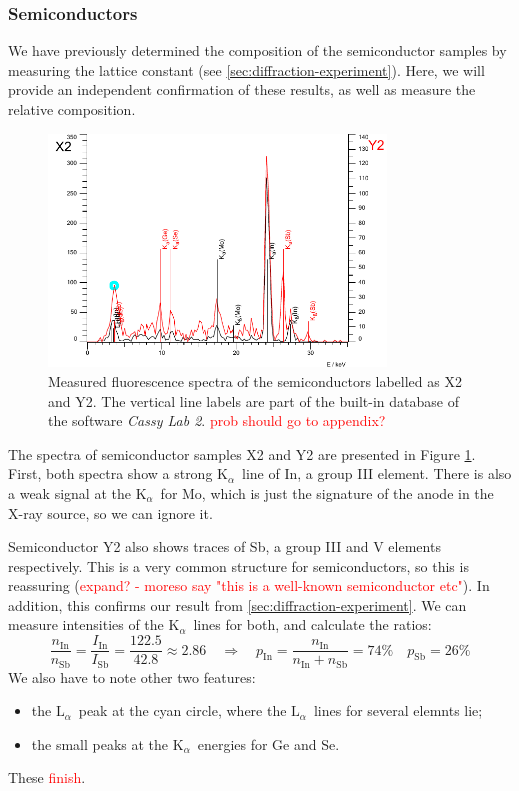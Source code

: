\documentclass[11pt,a4paper,twoside,onecolumn]{article}
\newcommand{\reminder}[1]{\textcolor{red}{#1}}
\newcommand{\Kalpha}{$\mathrm{K}_\alpha$~}
\newcommand{\Lalpha}{$\mathrm{L}_\alpha$~}
\begin{document}
\subsubsection{Semiconductors}
We have previously determined the composition of the semiconductor samples by measuring the lattice constant (see \ref{sec:diffraction-experiment}). Here, we will provide an independent confirmation of these results, as well as measure the relative composition.
\begin{figure}[!htbp]
    \centering
    \includegraphics[width=0.8\textwidth]{img/spect-semiconductors.pdf}
    \caption{Measured fluorescence spectra of the semiconductors labelled as X2 and Y2. The vertical line labels are part of the built-in database of the software \emph{Cassy Lab 2}. \reminder{prob should go to appendix?}}
    \label{fig:spect-semiconductors}
\end{figure}

The spectra of semiconductor samples X2 and Y2 are presented in Figure \ref{fig:spect-semiconductors}. First, both spectra show a strong \Kalpha line of In, a group III element. There is also a weak signal at the \Kalpha for Mo, which is just the signature of the anode in the X-ray source, so we can ignore it.

Semiconductor Y2 also shows traces of Sb, a group III and V elements respectively. This is a very common structure for semiconductors, so this is reassuring (\reminder{expand? - moreso say "this is a well-known semiconductor etc"}). In addition, this confirms our result from \ref{sec:diffraction-experiment}. We can measure intensities of the \Kalpha lines for both, and calculate the ratios:
\begin{equation}
    \frac{n_\mathrm{In}}{n_\mathrm{Sb}} = \frac{I_\mathrm{In}}{I_\mathrm{Sb}} = \frac{122.5}{42.8} \approx 2.86 \quad \Rightarrow \quad p_\mathrm{In} = \frac{n_\mathrm{In}}{n_\mathrm{In}+n_\mathrm{Sb}} = 74 \% \quad p_\mathrm{Sb} = 26 \%
\end{equation}
We also have to note other two features:
\begin{itemize}[noitemsep]
    \item the \Lalpha peak at the cyan circle, where the \Lalpha lines for several elemnts lie;
    \item the small peaks at the \Kalpha energies for Ge and Se.
\end{itemize}
These \reminder{finish}.
\end{document}
